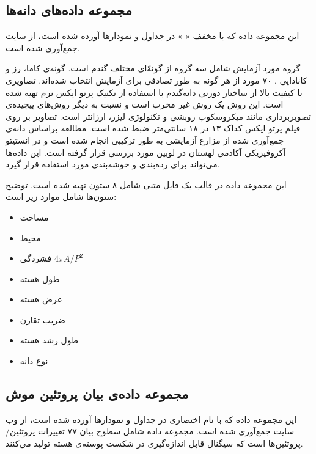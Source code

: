 \subsection{
مجموعه داده‌های دانه‌ها
}
\label{sec:Seeds}

این مجموعه داده که با مخفف «%
%
» در جداول و نمودارها آورده شده است، از سایت 
\cite{uci_seeds}
جمع‌آوری شده است.

گروه مورد آزمایش شامل سه گروه از گونه‌ّای مختلف گندم است. گونه‌ی کاما، رز و کانادایی%
%
. ۷۰ مورد از هر گونه به طور تصادفی برای آزمایش انتخاب شده‌اند. تصاویری با کیفیت بالا از ساختار دورنی دانه‌گندم با استفاده از تکنیک پرتو ایکس نرم%
تهیه شده است. این روش یک روش غیر مخرب است و نسبت به دیگر روش‌های پیچیده‌ی تصویربرداری مانند میکروسکوپ روبشی و تکنولوژی لیزر، ارزانتر است. تصاویر بر روی فیلم پرتو ایکس کداک ۱۳ در ۱۸ سانتی‌متر ضبط شده است. مطالعه براساس دانه‌ی جمع‌آوری شده از مزارع آزمایشی به طور ترکیبی انجام شده است و در انستیتو آکروفیزیکی آکادمی لهستان در لوبین مورد بررسی قرار گرفته است.%
این داده‌ها می‌تواند برای رده‌بندی و خوشه‌بندی مورد استفاده قرار گیرد.

این مجموعه داده در قالب یک فایل متنی شامل ۸ ستون تهیه شده است. توضیح ستون‌ها شامل موارد زیر است:

\begin{itemize}
\item
{}
مساحت
\item
{}
محیط
\item
{}
فشردگی 
$4 \pi A / P^2$
\item
{}
طول هسته
\item
{}
عرض هسته
\item
{}
ضریب تقارن
\item
{}
طول رشد هسته
\item
{}
نوع دانه
\end{itemize}

\subsection{
مجموعه داده‌ی بیان پروتئین موش
}
\label{sec:MPE}

این مجموعه داده که با نام اختصاری 
در جداول و نمودارها آورده شده است، از وب سایت
\cite{uci_MPE}
جمع‌آوری شده است. مجموعه داده شامل سطوح بیان ۷۷ تغییرات پروتئین/پروتئین‌ها است که سیگنال قابل اندازه‌گیری در شکست پوسته‌ی هسته تولید می‌کنند.

